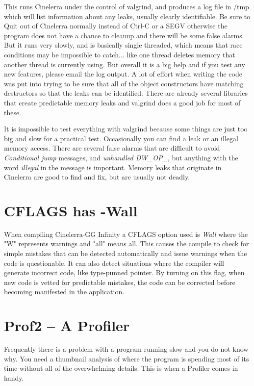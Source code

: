 This runs Cinelerra under the control of valgrind, and produces a log file in /tmp which will list information about any leaks, usually clearly identifiable. Be sure to Quit out of Cinelerra normally instead of Ctrl-C or a SEGV otherwise the program does not have a chance to cleanup and there will be some false alarms. But it runs very slowly, and is basically single threaded, which means that race conditions may be impossible to catch$\dots$ like one thread deletes memory that another thread is currently using. But overall it is a big help and if you test any new features, please email the log output. A lot of effort when writing the code was put into trying to be sure that all of the object constructors have matching destructors so that the leaks can be identified. There are already several libraries that create predictable memory leaks and valgrind does a good job for most of these.

It is impossible to test everything with valgrind because some things are just too big and slow for a practical test. Occasionally you can find a leak or an illegal memory access. There are several false alarms that are difficult to avoid \textit{Conditional jump} messages, and \textit{unhandled DW\_OP\_}, but anything with the word \textit{illegal} in the message is important. Memory leaks that originate in Cinelerra are good to find and fix, but are usually not deadly.

\section{CFLAGS has -Wall}
\label{sec:cflags_has_-wall}
When compiling Cinelerra-GG Infinity a CFLAGS option used is \textit{Wall} where the "W" represents warnings and "all" means all.  This causes the compile to check for simple mistakes that can be detected automatically and issue warnings when the code is questionable.  It can also detect situations where the compiler will generate incorrect code, like type-punned pointer.  By turning on this flag, when new code is vetted for predictable mistakes, the code can be corrected before becoming manifested in the application.

\section{Prof2 -- A Profiler}
\label{sec:prof2_profiler}

Frequently there is a problem with a program running slow and you do not know why. You need a thumbnail analysis of where the program is spending most of its time without all of the overwhelming details. This is when a Profiler comes in handy.

